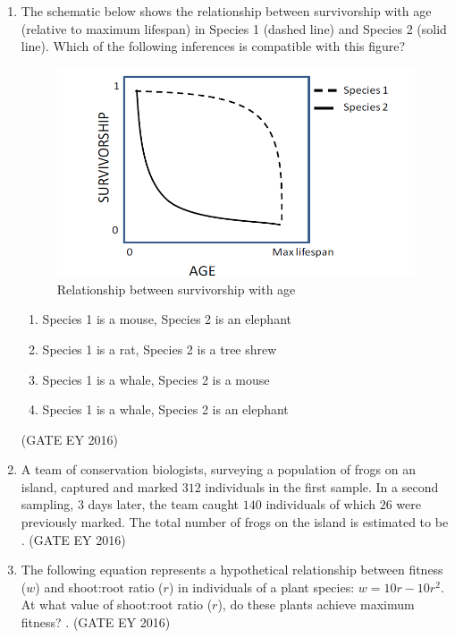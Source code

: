 \documentclass[journal]{IEEEtran}
\begin{document}
\begin{enumerate}[label=Q.\arabic*.]
\item The schematic below shows the relationship between survivorship with age (relative to maximum lifespan) in Species 1 (dashed line) and Species 2 (solid line). Which of the following inferences is compatible with this figure? 
\begin{figure}
    \centering
    \includegraphics[width=0.7\columnwidth]{figs/Q-52.png}
    \caption{Relationship between survivorship with age}
    \label{Fig.7}
\end{figure}
\begin{enumerate}
    \item Species 1 is a mouse, Species 2 is an elephant
    \item Species 1 is a rat, Species 2 is a tree shrew
    \item Species 1 is a whale, Species 2 is a mouse
    \item Species 1 is a whale, Species 2 is an elephant
\end{enumerate}
\hfill{(GATE EY 2016)}

\item A team of conservation biologists, surveying a population of frogs on an island, captured and marked $312$ individuals in the first sample. In a second sampling, $3$ days later, the team caught $140$ individuals of which $26$ were previously marked. The total number of frogs on the island is estimated to be \underline{\hspace{3cm}}.
\hfill{(GATE EY 2016)}
\bigskip
 
\item The following equation represents a hypothetical relationship between fitness ($w$) and shoot:root ratio ($r$) in individuals of a plant species: $w = 10r - 10r^2$. At what value of shoot:root ratio ($r$), do these plants achieve maximum fitness? \underline{\hspace{3cm}}.
\hfill{(GATE EY 2016)}
\bigskip
 

\end{enumerate}
\end{document}
